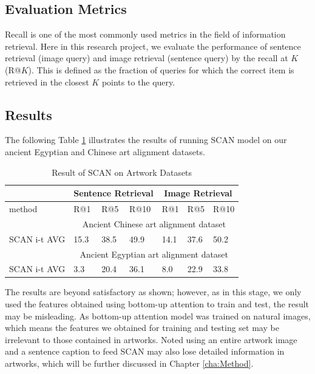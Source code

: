 \subsection{Evaluation Metrics}

Recall is one of the most commonly used metrics in the field of information retrieval. Here in this research project, we evaluate the performance of sentence retrieval (image query) and image retrieval (sentence query) by the recall at $K$ (R@$K$). This is defined as the fraction of queries for which the correct item is retrieved in the closest $K$ points to the query. 

\subsection{Results}

The following Table \ref{table:resultscan} illustrates the results of running SCAN model on our ancient Egyptian and Chinese art alignment datasets.

\begin{table}[h!]
\centering
\begin{tabular}{lllllll}
                       & \multicolumn{3}{c}{Sentence Retrieval} & \multicolumn{3}{c}{Image Retrieval} \\ \hline
method                 & R@1         & R@5         & R@10       & R@1        & R@5        & R@10      \\ \hline
\multicolumn{1}{r}{}   & \multicolumn{6}{c}{Ancient Chinese art alignment dataset}                   \\ \hline
SCAN i-t AVG & 15.3        & 38.5        & 49.9       & 14.1       & 37.6       & 50.2      \\ \hline
\multicolumn{1}{r}{}   & \multicolumn{6}{c}{Ancient Egyptian art alignment dataset}                    \\ \hline
SCAN i-t AVG & 3.3         & 20.4        & 36.1       & 8.0        & 22.9       & 33.8     
\end{tabular}
\caption{Result of SCAN on Artwork Datasets}
\label{table:resultscan}
\end{table}

The results are beyond satisfactory as shown; however, as in this stage, we only used the features obtained using bottom-up attention \cite{bottomup} to train and test, the result may be misleading. As bottom-up attention model was trained on natural images, which means the features we obtained for training and testing set may be irrelevant to those contained in artworks. Noted using an entire artwork image and a sentence caption to feed SCAN may also lose detailed information in artworks, which will be further discussed in Chapter \ref{cha:Method}.

